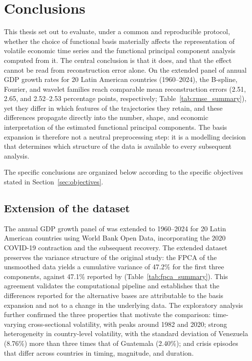 
\section{Conclusions}
\label{sec:conclusions}

This thesis set out to evaluate, under a common and reproducible
protocol, whether the choice of functional basis materially affects the
representation of volatile economic time series and the functional
principal component analysis computed from it. The central conclusion is
that it does, and that the effect cannot be read from reconstruction
error alone. On the extended panel of annual GDP growth rates for 20
Latin American countries (1960--2024), the B-spline, Fourier, and
wavelet families reach comparable mean reconstruction errors (2.51,
2.65, and 2.52--2.53 percentage points, respectively;
Table~\ref{tab:rmse_summary}), yet they differ in which features of the
trajectories they retain, and these differences propagate directly into
the number, shape, and economic interpretation of the estimated
functional principal components. The basis expansion is therefore not a
neutral preprocessing step: it is a modelling decision that determines
which structure of the data is available to every subsequent analysis.

The specific conclusions are organized below according to the specific
objectives stated in Section~\ref{sec:objectives}.

\subsection{Extension of the dataset}

The annual GDP growth panel of \cite{padilla2020} was extended to
1960--2024 for 20 Latin American countries using World Bank Open Data,
incorporating the 2020 COVID-19 contraction and the subsequent recovery.
The extended dataset preserves the variance structure of the original
study: the FPCA of the unsmoothed data yields a cumulative variance of
47.2\% for the first three components, against 47.1\% reported by
\cite{padilla2020} (Table~\ref{tab:fpca_summary}). This agreement
validates the computational pipeline and establishes that the
differences reported for the alternative bases are attributable to the
basis expansion and not to a change in the underlying data. The
exploratory analysis further confirmed the three properties that
motivate the comparison: time-varying cross-sectional volatility, with
peaks around 1982 and 2020; strong heterogeneity in country-level
volatility, with the standard deviation of Venezuela (8.76\%) more than
three times that of Guatemala (2.40\%); and crisis episodes that differ
across countries in timing, magnitude, and duration.

